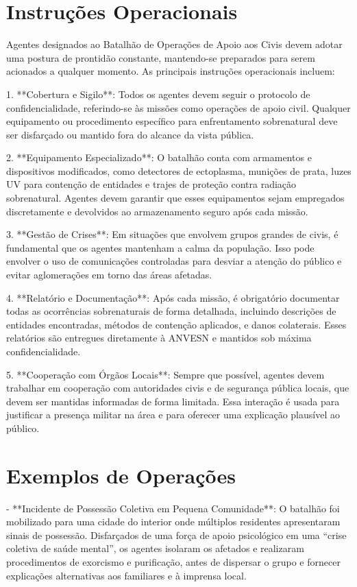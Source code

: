\documentclass{book}
\begin{document}
\section{Instruções Operacionais}
Agentes designados ao Batalhão de Operações de Apoio aos Civis devem adotar uma postura de prontidão constante, mantendo-se preparados para serem acionados a qualquer momento. As principais instruções operacionais incluem:

1. **Cobertura e Sigilo**: Todos os agentes devem seguir o protocolo de confidencialidade, referindo-se às missões como operações de apoio civil. Qualquer equipamento ou procedimento específico para enfrentamento sobrenatural deve ser disfarçado ou mantido fora do alcance da vista pública.

2. **Equipamento Especializado**: O batalhão conta com armamentos e dispositivos modificados, como detectores de ectoplasma, munições de prata, luzes UV para contenção de entidades e trajes de proteção contra radiação sobrenatural. Agentes devem garantir que esses equipamentos sejam empregados discretamente e devolvidos ao armazenamento seguro após cada missão.

3. **Gestão de Crises**: Em situações que envolvem grupos grandes de civis, é fundamental que os agentes mantenham a calma da população. Isso pode envolver o uso de comunicações controladas para desviar a atenção do público e evitar aglomerações em torno das áreas afetadas.

4. **Relatório e Documentação**: Após cada missão, é obrigatório documentar todas as ocorrências sobrenaturais de forma detalhada, incluindo descrições de entidades encontradas, métodos de contenção aplicados, e danos colaterais. Esses relatórios são entregues diretamente à ANVESN e mantidos sob máxima confidencialidade.

5. **Cooperação com Órgãos Locais**: Sempre que possível, agentes devem trabalhar em cooperação com autoridades civis e de segurança pública locais, que devem ser mantidas informadas de forma limitada. Essa interação é usada para justificar a presença militar na área e para oferecer uma explicação plausível ao público.

\section{Exemplos de Operações}
- **Incidente de Possessão Coletiva em Pequena Comunidade**: O batalhão foi mobilizado para uma cidade do interior onde múltiplos residentes apresentaram sinais de possessão. Disfarçados de uma força de apoio psicológico em uma ``crise coletiva de saúde mental'', os agentes isolaram os afetados e realizaram procedimentos de exorcismo e purificação, antes de dispersar o grupo e fornecer explicações alternativas aos familiares e à imprensa local.
\end{document}
